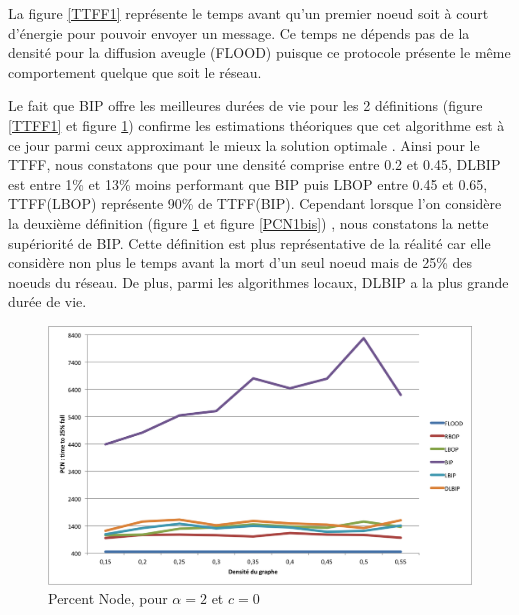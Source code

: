 La figure \ref{TTFF1} représente le temps avant qu'un premier noeud soit à court d'énergie pour pouvoir envoyer un message. Ce temps ne dépends pas de la densité pour la diffusion aveugle (FLOOD) puisque ce protocole présente le même comportement quelque que soit le réseau.

Le fait que BIP offre les meilleures durées de vie pour les 2 définitions (figure \ref{TTFF1} et figure \ref{PCN1}) confirme les estimations théoriques que cet algorithme est à ce jour parmi ceux approximant le mieux la solution optimale \cite{Liang2002}. Ainsi pour le TTFF, nous constatons que pour une densité comprise entre 0.2 et 0.45, DLBIP est  entre 1\% et 13\% moins performant que BIP puis LBOP entre 0.45
et 0.65, TTFF(LBOP) représente 90\% de TTFF(BIP). Cependant lorsque l'on considère la deuxième définition (figure \ref{PCN1} et figure \ref{PCN1bis}) , nous constatons la nette supériorité de BIP. Cette définition est plus représentative de la réalité car elle 
considère non plus le temps avant la mort d'un seul noeud mais de 25\% des noeuds du réseau. De plus, parmi les algorithmes locaux, DLBIP a la plus grande durée de vie.  


\begin{figure}[H]
\begin{bigcenter}
\includegraphics[scale=0.75]{Simus/pcn_2_0}
\caption{Percent Node, pour $\alpha = 2$ et $c = 0$ }
\label{PCN1}
\end{bigcenter}
\end{figure}

